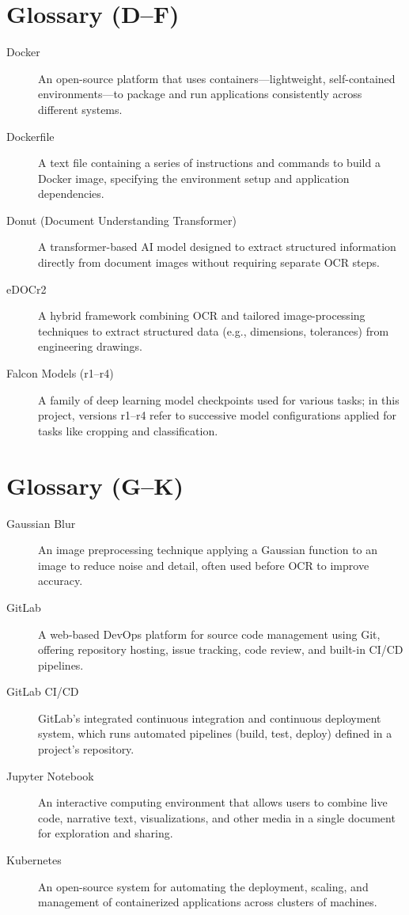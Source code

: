 \section*{Glossary (D–F)}
\begin{description}
  \item[Docker] 
    An open-source platform that uses containers—lightweight, self-contained 
    environments—to package and run applications consistently across different systems.
  \item[Dockerfile] 
    A text file containing a series of instructions and commands to build a Docker 
    image, specifying the environment setup and application dependencies.
  \item[Donut (Document Understanding Transformer)] 
    A transformer-based AI model designed to extract structured information directly 
    from document images without requiring separate OCR steps.
  \item[eDOCr2] 
    A hybrid framework combining OCR and tailored image-processing techniques to 
    extract structured data (e.g., dimensions, tolerances) from engineering drawings.
  \item[Falcon Models (r1–r4)] 
    A family of deep learning model checkpoints used for various tasks; in this project, 
    versions r1–r4 refer to successive model configurations applied for tasks like cropping and classification.
\end{description}
\section*{Glossary (G–K)}
\begin{description}
  \item[Gaussian Blur] 
    An image preprocessing technique applying a Gaussian function to an image to 
    reduce noise and detail, often used before OCR to improve accuracy.
  \item[GitLab] 
    A web-based DevOps platform for source code management using Git, offering 
    repository hosting, issue tracking, code review, and built-in CI/CD pipelines.
  \item[GitLab CI/CD] 
    GitLab’s integrated continuous integration and continuous deployment system, 
    which runs automated pipelines (build, test, deploy) defined in a project’s repository.
  \item[Jupyter Notebook] 
    An interactive computing environment that allows users to combine live code, 
    narrative text, visualizations, and other media in a single document for exploration and sharing.
  \item[Kubernetes] 
    An open-source system for automating the deployment, scaling, and management of 
    containerized applications across clusters of machines.
\end{description}
